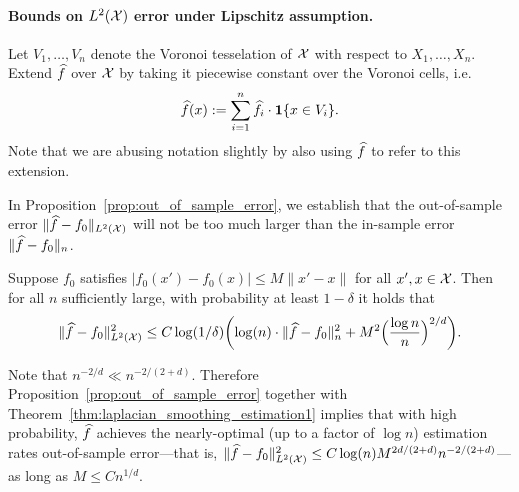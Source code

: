 \paragraph{Bounds on $L^2(\mathcal{X})$ error under Lipschitz assumption.}
Let $V_1,\ldots,V_n$ denote the Voronoi tesselation of $\mathcal{X}$ with respect to $X_1,\ldots,X_n$. Extend $\widehat{f}$ over $\mathcal{X}$ by taking it piecewise constant over the Voronoi cells, i.e.
\begin{equation*}
\widehat{f}(x) := \sum_{i = 1}^{n} \widehat{f}_i \cdot \mathbf{1}\{x \in V_i\}.
\end{equation*}
Note that we are abusing notation slightly by also using $\widehat{f}$ to refer to this extension. 

In Proposition~\ref{prop:out_of_sample_error}, we establish that the out-of-sample error $\|\widehat{f} - f_0\|_{L^2(\mathcal{X})}$ will not be too much larger than the in-sample error $\|\widehat{f} - f_0\|_n$.
\begin{proposition}
	\label{prop:out_of_sample_error}
	Suppose $f_0$ satisfies $|f_0(x') - f_0(x)| \leq M \|x' - x\|$ for all $x',x \in \mathcal{X}$. Then for all $n$ sufficiently large, with probability at least $1 - \delta$ it holds that
	\begin{equation*}
	\|\widehat{f} - f_0\|_{L^2(\mathcal{X})}^2 \leq C \log(1/\delta) \biggl(\log(n)\cdot \|\widehat{f} - f_0\|_n^2 + M^2\Bigl(\frac{\log n}{n}\Bigr)^{2/d}\biggr).
	\end{equation*}
\end{proposition}
Note that $n^{-2/d} \ll n^{-2/(2 +d)}$. Therefore Proposition~\ref{prop:out_of_sample_error} together with Theorem~\ref{thm:laplacian_smoothing_estimation1} implies that with high probability, $\widehat{f}$ achieves the nearly-optimal (up to a factor of $\log n$) estimation rates out-of-sample error---that is, $\|\widehat{f} - f_0\|_{L^2(\mathcal{X})}^2 \leq C \log(n) M^{2d/(2 + d)}n^{-2/(2+d)}$---as long as $M \leq Cn^{1/d}$.

